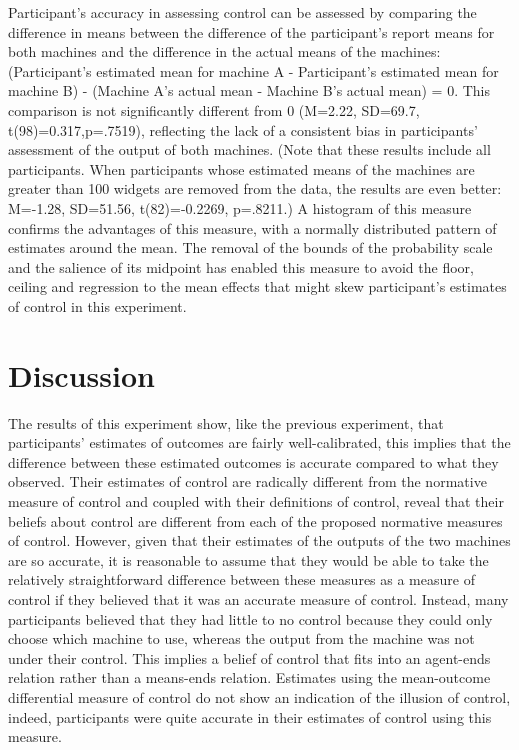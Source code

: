 \documentclass[USenglish,letterpaper,12pt,extrafontsizes,oneside,onecolumn,final]{memoir}
\begin{document}
Participant's accuracy in assessing control can be assessed by comparing the difference in means between the difference of the participant's report means for both machines and the difference in the actual means of the machines: (Participant's estimated mean for machine A - Participant's estimated mean for machine B) - (Machine A's actual mean - Machine B's actual mean) = 0.  This comparison is not significantly different from 0 (M=2.22, SD=69.7, t(98)=0.317,p=.7519), reflecting the lack of a consistent bias  in participants' assessment of the output of both machines. (Note that these results include all participants.  When participants whose estimated means of the machines are greater than 100 widgets are removed from the data, the results are even better: M=-1.28, SD=51.56, t(82)=-0.2269, p=.8211.)  A histogram of this measure confirms the advantages of this measure, with a normally distributed pattern of estimates around the mean.  The removal of the bounds of the probability scale and the salience of its midpoint has enabled this measure to avoid the floor, ceiling and regression to the mean effects that might skew participant's estimates of control in this experiment.  

\section{Discussion}

The results of this experiment show, like the previous experiment, that participants' estimates of outcomes are fairly well-calibrated, this implies that the difference between these estimated outcomes is accurate compared to what they observed.   Their estimates of control are radically different from the normative measure of control and coupled with their definitions of control, reveal that their beliefs about control are different from each of the proposed normative measures of control.  However, given that their estimates of the outputs of the two machines are so accurate, it is reasonable to assume that they would be able to take the relatively straightforward difference between these measures as a measure of control if they believed that it was an accurate measure of control. Instead, many participants believed that they had little to no control because they could only choose which machine to use, whereas the output from the machine was not under their control.  This implies a belief of control that fits into an agent-ends relation rather than a means-ends relation. Estimates using the mean-outcome differential measure of control do not show an indication of the illusion of control, indeed, participants were quite accurate in their estimates of control using this measure.  
\end{document}
